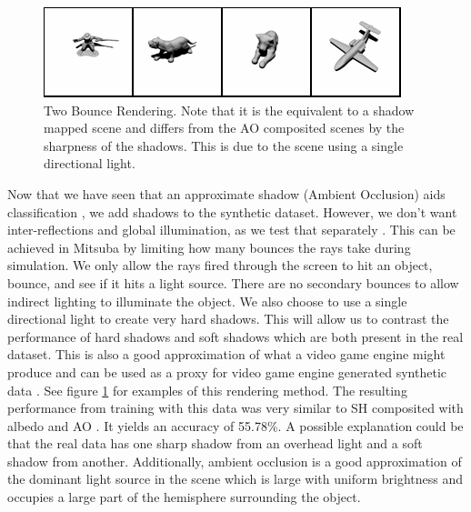 \begin{figure}[h!]
\centering
\includegraphics[width=1.0\columnwidth]{./assets/2bounce_small.png}
\caption{Two Bounce Rendering.  Note that it is the equivalent to a shadow mapped scene and differs from the AO composited scenes by the sharpness of the shadows. This is due to the scene using a single directional light.}
\label{fig:2BOUNCE}
\end{figure}
Now that we have seen that an approximate shadow (Ambient Occlusion) aids classification , we add shadows to the synthetic dataset. However, we don't want inter-reflections and global illumination, as we test that separately .  This can be achieved in Mitsuba by limiting how many bounces the rays take during simulation.  We only allow the rays fired through the screen to hit an object, bounce, and see if it hits a light source.  There are no secondary bounces to allow indirect lighting to illuminate the object. We also choose  to use a single directional light to create very hard shadows.  This will allow us to contrast the performance of hard shadows and soft shadows which are both present in the real dataset.  This is also a good approximation of what a video game engine might produce and can be used as a proxy for video game engine generated synthetic data .  See figure \ref{fig:2BOUNCE} for examples of this rendering method.   The resulting performance from training with this data was very similar to SH composited with albedo and AO .  It yields an accuracy of 55.78\%.  A possible explanation could be that the real data has one sharp shadow from an overhead light and a soft shadow from another. Additionally, ambient occlusion is a good approximation of the dominant light source in the scene which is large with uniform brightness and occupies a large part of the hemisphere surrounding the object.


